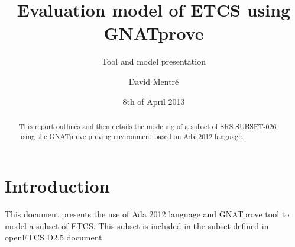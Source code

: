 \documentclass{template/openetcs_report}
\begin{document}
\frontmatter
{}




\title{Evaluation model of ETCS using GNATprove}

\subtitle{Tool and model presentation}

\date{8th of April 2013}

\author{David Mentré}





\begin{abstract}
This report outlines and then details the modeling of a subset of
SRS SUBSET-026 using the GNATprove proving environment based on Ada
2012 language.
\end{abstract}

\maketitle
\tableofcontents
\listoffiguresandtables


\mainmatter

\chapter{Introduction}

This document presents the use of Ada 2012 language and GNATprove tool
to model a subset of ETCS. This subset is included in the subset
defined in openETCS D2.5 document\cite{openetcs:D2.5}.
\end{document}
